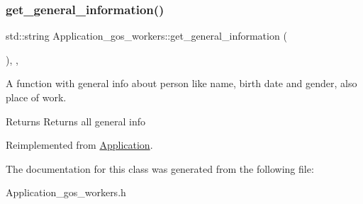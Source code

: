 \subsubsection{\texorpdfstring{get\+\_\+general\+\_\+information()}{get\_general\_information()}}
{\footnotesize\ttfamily std\+::string Application\+\_\+gos\+\_\+workers\+::get\+\_\+general\+\_\+information (\begin{DoxyParamCaption}{ }\end{DoxyParamCaption})\hspace{0.3cm}{\ttfamily [inline]}, {\ttfamily [override]}, {\ttfamily [virtual]}}



A function with general info about person like name, birth date and gender, also place of work. 

\begin{DoxyReturn}{Returns}
Returns all general info 
\end{DoxyReturn}


Reimplemented from \mbox{\hyperlink{classApplication_ab53eea16f9023504def363a58eee2240}{Application}}.



The documentation for this class was generated from the following file\+:\begin{DoxyCompactItemize}
\item 
Application\+\_\+gos\+\_\+workers.\+h\end{DoxyCompactItemize}
